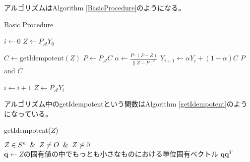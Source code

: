 アルゴリズムはAlgorithm \ref{BasicProcedure}のようになる。
\begin{algorithm}
  \caption{Basic Procedure}
  \label{BasicProcedure}
  \begin{algorithmic}[1]
    \State $i \leftarrow 0$
    \State $Z \leftarrow P_\mathcal{A} Y_0$

      \State $C \leftarrow \text{getIdempotent}(Z)$
      \State $P \leftarrow P_\mathcal{A} C$
        \State $\alpha \leftarrow \displaystyle{\frac{P \cdot (P - Z)}{\|Z - P\|^2}}$
        \State $Y_{i + 1} \leftarrow \alpha Y_i + (1 - \alpha) C$
      \Else
        \State \Return $P$ and $C$
      \EndIf

      \State $i \leftarrow i + 1$
      \State $Z \leftarrow P_\mathcal{A} Y_i$
    \EndWhile
  \end{algorithmic}
\end{algorithm}

アルゴリズム中のgetIdempotentという関数はAlgorithm \ref{getIdempotent}のようになっている。
\begin{algorithm}
  \caption{getIdempotent($Z$)}
  \label{getIdempotent}
  \begin{algorithmic}
    \Input $Z \in S^n \And Z \not= O \And Z \not\succ 0$
    \State $\mathbf{q} \leftarrow Z\text{の固有値の中でもっとも小さなものにおける単位固有ベクトル}$
    \State \Return $\mathbf{q} \mathbf{q}^T$
  \end{algorithmic}
\end{algorithm}

